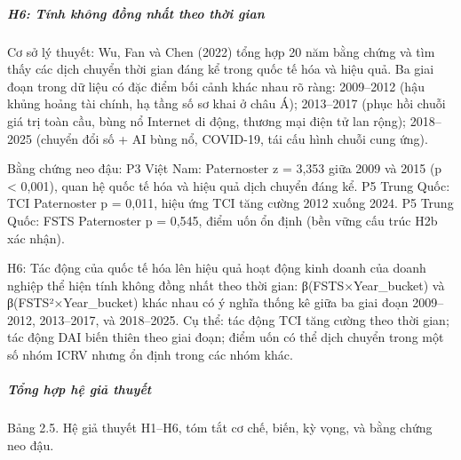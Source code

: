 \documentclass[
  a4paper,
  13pt]{extreport}
\begin{document}
\hypertarget{h6-tuxednh-khuxf4ng-ux111ux1ed3ng-nhux1ea5t-theo-thux1eddi-gian}{%
\subparagraph{H6: Tính không đồng nhất theo thời
gian}\label{h6-tuxednh-khuxf4ng-ux111ux1ed3ng-nhux1ea5t-theo-thux1eddi-gian}}

Cơ sở lý thuyết: Wu, Fan và Chen (2022) tổng hợp 20 năm bằng chứng và
tìm thấy các dịch chuyển thời gian đáng kể trong quốc tế hóa và hiệu
quả. Ba giai đoạn trong dữ liệu có đặc điểm bối cảnh khác nhau rõ ràng:
2009--2012 (hậu khủng hoảng tài chính, hạ tầng số sơ khai ở châu Á);
2013--2017 (phục hồi chuỗi giá trị toàn cầu, bùng nổ Internet di động,
thương mại điện tử lan rộng); 2018--2025 (chuyển đổi số + AI bùng nổ,
COVID-19, tái cấu hình chuỗi cung ứng).

Bằng chứng neo đậu: P3 Việt Nam: Paternoster z = 3,353 giữa 2009 và 2015
(p \textless{} 0,001), quan hệ quốc tế hóa và hiệu quả dịch chuyển đáng
kể. P5 Trung Quốc: TCI Paternoster p = 0,011, hiệu ứng TCI tăng cường
2012 xuống 2024. P5 Trung Quốc: FSTS Paternoster p = 0,545, điểm uốn ổn
định (bền vững cấu trúc H2b xác nhận).

H6: Tác động của quốc tế hóa lên hiệu quả hoạt động kinh doanh của doanh
nghiệp thể hiện tính không đồng nhất theo thời gian:
β(FSTS×Year\_bucket) và β(FSTS²×Year\_bucket) khác nhau có ý nghĩa thống
kê giữa ba giai đoạn 2009--2012, 2013--2017, và 2018--2025. Cụ thể: tác
động TCI tăng cường theo thời gian; tác động DAI biến thiên theo giai
đoạn; điểm uốn có thể dịch chuyển trong một số nhóm ICRV nhưng ổn định
trong các nhóm khác.

\hypertarget{tux1ed5ng-hux1ee3p-hux1ec7-giux1ea3-thuyux1ebft}{%
\subparagraph{Tổng hợp hệ giả
thuyết}\label{tux1ed5ng-hux1ee3p-hux1ec7-giux1ea3-thuyux1ebft}}

Bảng 2.5. Hệ giả thuyết H1--H6, tóm tắt cơ chế, biến, kỳ vọng, và bằng
chứng neo đậu.
\end{document}
